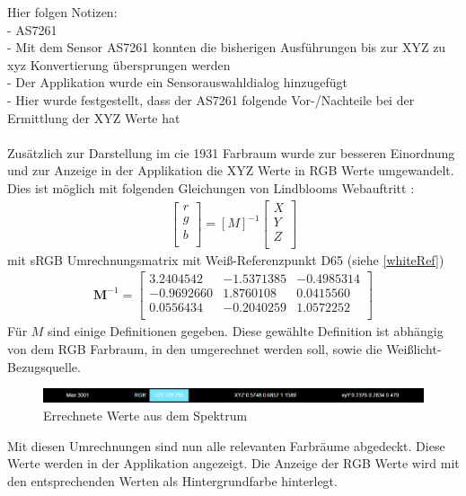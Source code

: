 \documentclass[11pt]{scrartcl}
\begin{document}
\noindent
{\color{red}
Hier folgen Notizen:\\
- AS7261\\
- Mit dem Sensor AS7261 konnten die bisherigen Ausführungen bis zur XYZ zu xyz Konvertierung übersprungen werden\\
- Der Applikation wurde ein Sensorauswahldialog hinzugefügt\\
- Hier wurde festgestellt, dass der AS7261 folgende Vor-/Nachteile bei der Ermittlung der XYZ Werte hat\\}
\\
Zusätzlich zur Darstellung im \ac{cie} 1931 Farbraum wurde zur besseren Einordnung und zur Anzeige in der Applikation die XYZ Werte in RGB Werte
umgewandelt. Dies ist möglich mit folgenden Gleichungen von Lindblooms Webauftritt \cite{lindbloom}:
\begin{align}\label{Equ:12}
    \left[ \begin{array}{r}
        r \\
        g \\
        b \\
    \end{array}\right]
    = [M]^{-1} \left[ \begin{array}{r}
        X \\
        Y \\
        Z \\
    \end{array}\right]
\end{align}
mit sRGB Umrechnungsmatrix mit Weiß-Referenzpunkt D65 (siehe \ref{whiteRef})
\begin{align}\label{Equ:13}
    \mathbf M^{-1} = \left[ \begin{array}{rrr}
        3.2404542  & -1.5371385 & -0.4985314 \\
        -0.9692660 & 1.8760108  & 0.0415560  \\
        0.0556434  & -0.2040259 & 1.0572252  \\
    \end{array}\right]
\end{align}
Für $M$ sind einige Definitionen gegeben. Diese gewählte Definition ist abhängig von dem RGB Farbraum, in den umgerechnet werden soll, sowie
die Weißlicht-Bezugsquelle.
\begin{figure}[H]
    \begin{center}
        \includegraphics[width=\textwidth]{images/app_dummy_info_with_rgb.png}
    \end{center}
    \caption{Errechnete Werte aus dem Spektrum}
\end{figure}
\noindent
Mit diesen Umrechnungen sind nun alle relevanten Farbräume abgedeckt. Diese Werte werden in der Applikation angezeigt. Die Anzeige der RGB Werte
wird mit den entsprechenden Werten als Hintergrundfarbe hinterlegt.
\end{document}
